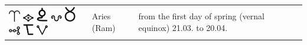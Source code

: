 \documentclass[british,final,landscape]{scrartcl}
\begin{document}
\begin{refsection}
 \tablelasttail{\bottomrule}
 \begin{supertabular}{p{0.3\textwidth}p{0.34\textwidth}p{0.34\textwidth}}
  \includegraphics[width=5mm]{Astrology/Aries}  \includegraphics[width=5mm]{Astrology/Aries2} \includegraphics[width=5mm]{Astrology/Aries3} \includegraphics[width=5mm]{Astrology/Aries4} \includegraphics[width=5mm]{Astrology/Aries5} \includegraphics[width=5mm]{Astrology/Aries6} \includegraphics[width=5mm]{Astrology/Aries7} \includegraphics[width=5mm]{Astrology/Aries8} & Aries (Ram) & from the first day of spring (vernal equinox) 21.03. to 20.04. \\

\end{supertabular}
\end{refsection}
\end{document}
